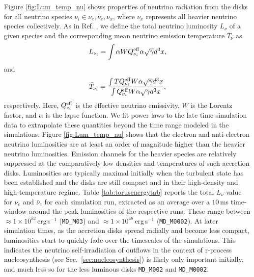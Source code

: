 Figure \ref{fig:Lum_temp_nu} shows properties of neutrino radiation from the disks for all neutrino species $\nu_i \in {\nu_{e}, \bar \nu_{e}, \nu_{x}}$, where $\nu_{x}$ represents all heavier neutrino species collectively. As in Ref. \cite{Siegel:2017jug}, we define the total neutrino luminosity $L_\nu$ of a given species and the corresponding mean neutrino emission temperature $\bar T_\nu$ as
\begin{equation}
    L_{\nu_i} = \int \alpha W Q_{\nu_i}^{\rm eff} \alpha\sqrt{\gamma}d^{3}x,
\end{equation}
and
\begin{equation}
    \bar T_{\nu_i} = \frac{\int TQ_{\nu_i}^{\rm eff}W\alpha\sqrt{\gamma}d^{3}x}{\int Q_{\nu_i}^{\rm eff}W\alpha\sqrt{\gamma}d^{3}x},
\end{equation}
respectively. Here, $Q_{\nu_i}^{\rm eff}$ is the effective neutrino emissivity, $W$ is the Lorentz factor, and $\alpha$ is the lapse function. We fit power laws to the late time simulation data to extrapolate these quantities beyond the time range modeled in the simulations. Figure \ref{fig:Lum_temp_nu} shows that the electron and anti-electron neutrino luminosities are at least an order of magnitude higher than the heavier neutrino luminosities. Emission channels for the heavier species are relatively suppressed at the comparatively low densities and temperatures of such accretion disks. Luminosities are typically maximal initially when the turbulent state has been established and the disks are still compact and in their high-density and high-temperature regime. Table \ref{tab:torusenergytab} reports the total $L_\nu$-value for $\nu_e$ and $\bar{\nu}_e$ for each simulation run, extracted as an average over a $10$\,ms time-window around the peak luminosities of the respective runs. These range between $\approx\!1\times 10^{52}$\,erg\,s$^{-1}$ (\texttt{MD\_M03}) and $\approx\!1\times 10^{48}$\,erg\,s$^{-1}$ (\texttt{MD\_M0002}). %
At later simulation times, as the accretion disks spread radially and become less compact, luminosities start to quickly fade over the timescales of the simulations. This indicates the neutrino self-irradiation of outflows in the context of r-process nucleosynthesis (see Sec.~\ref{sec:nucleosynthesis}) is likely only important initially, and much less so for the less luminous disks \texttt{MD\_M002} and \texttt{MD\_M0002}.



